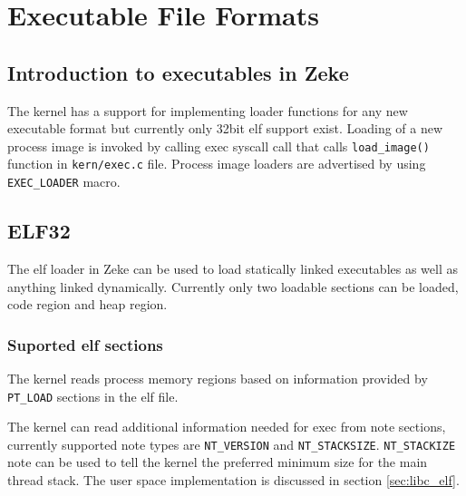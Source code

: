 \chapter{Executable File Formats}
\label{chap:exec}

\section{Introduction to executables in Zeke}

The kernel has a support for implementing loader functions for any new
executable format but currently only 32bit \acf{elf} support exist.
Loading of a new process image is invoked by calling exec syscall call that
calls \verb+load_image()+ function in \verb+kern/exec.c+ file.
Process image loaders are advertised by using \verb+EXEC_LOADER+ macro.

\section{ELF32}

The \acs{elf} loader in Zeke can be used to load statically linked executables
as well as anything linked dynamically. Currently only two loadable sections can
be loaded, code region and heap region.

\subsection{Suported \acs{elf} sections}

The kernel reads process memory regions based on information provided by
\verb+PT_LOAD+ sections in the \acs{elf} file.

The kernel can read additional information needed for exec from note sections,
currently supported note types are \verb+NT_VERSION+ and \verb+NT_STACKSIZE+.
\verb+NT_STACKIZE+ note can be used to tell the kernel the preferred minimum
size for the main thread stack. The user space implementation is discussed in
section \ref{sec:libc_elf}.
